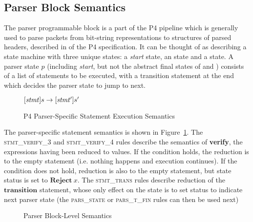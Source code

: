 \documentclass[UTF8]{article}
\begin{document}
\newpage
\newcommand{\start}{\textit{start}}
\subsection{Parser Block Semantics}
The parser programmable block is a part of the P4 pipeline which is generally used to parse packets from bit-string representations to structures of parsed headers, described in  of the P4 specification. It can be thought of as describing a state machine with three unique states: a \start{} state, an \accept{} state and a \reject{\msg{}} state. A parser state $p$ (including \start{}, but not the abstract final states of \accept{} and \reject{\msg{}}) consists of a list of statements to be executed, with a transition statement at the end which decides the parser state to jump to next.

\begin{figure}[ht!]
\begin{ottdefnblock}{$[  \mathit{stmt}  ]  s  \rightarrow  [  \mathit{stmt'}  ]  s'$}{}
\ottusedrule{\ottdrulestmtXXverifyXXThree{}}
\ottusedrule{\ottdrulestmtXXverifyXXFour{}}
\ottusedrule{\ottdrulestmtXXtransXXOne{}}
\ottusedrule{\ottdrulestmtXXtransXXTwo{}}
\ottusedrule{\ottdrulestmtXXtransXXThree{}}
\end{ottdefnblock}
\caption{P4 Parser-Specific Statement Execution Semantics}
\label{fig:parssemstmtexec}
\end{figure}

The parser-specific statement semantics is shown in Figure~\ref{fig:parssemstmtexec}. The \textsc{stmt\_verify\_3} and \textsc{stmt\_verify\_4} rules describe the semantics of \textbf{verify}, the expressions having been reduced to values. If the condition holds, the reduction is to the empty statement (i.e. nothing happens and execution continues). If the condition does not hold, reduction is also to the empty statement, but state status is set to $\mathbf{Reject}\ x$. The \textsc{stmt\_trans} rules describe reduction of the $\mathbf{transition}$ statement, whose only effect on the state is to set status to indicate next parser state (the \textsc{pars\_state} or \textsc{pars\_t\_fin} rules can then be used next)

\begin{figure}[ht!]
\ottdefnsparsXXsem
\caption{Parser Block-Level Semantics}
\label{fig:semparsexec}
\end{figure}
\end{document}
